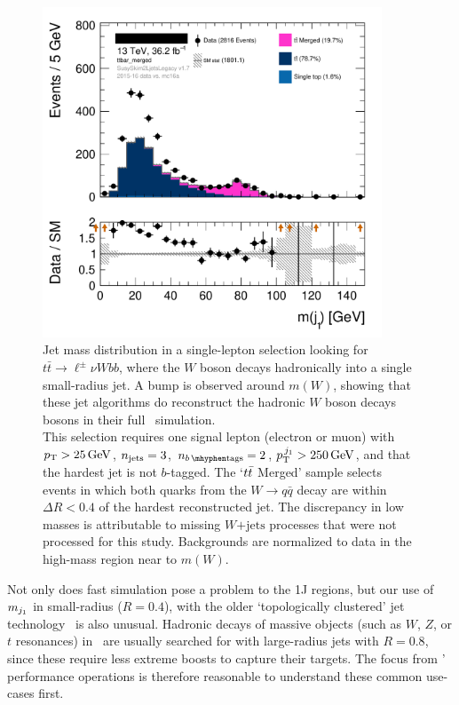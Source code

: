 \begin{figure}[tp]
\centering
\includegraphics[width=0.9\textwidth]{figures/2Ljets_hist1d_jetM0_ttbar_merged_tweak.png}
\caption[
Jet mass distribution in a single-lepton selection looking for
$t\bar t \rightarrow \ell^\pm\nu W(J) \bar bb$
]{%
Jet mass distribution in a single-lepton selection looking for
$t\bar t \rightarrow \ell^\pm\nu W bb$, where the $W$ boson decays hadronically
into a single small-radius jet.
A bump is observed around $m(W)$, showing that these jet algorithms do
reconstruct the hadronic $W$ boson decays bosons in their full \atlas\
simulation.
\\
This selection requires one signal lepton (electron or muon) with
$\pt > 25\,\eV[G]$, $\njet = 3$, $\nbtag = 2$, $\ptjone > 250\,\eV[G]$,
and that the hardest jet is not $b$-tagged.
The `$\ttbar$ Merged' sample selects events in which both quarks from the
$W\rightarrow q\bar q$ decay are within $\Delta R < 0.4$ of the hardest
reconstructed jet.
The discrepancy in low masses is attributable to missing $W\mathrm{+jets}$
processes that were not processed for this study.
Backgrounds are normalized to data in the high-mass region near to $m(W)$.
}
\label{fig:2ljets_jetm_ttbar_mw}
\end{figure}

Not only does fast simulation pose a problem to the 1J regions, but our use
of $\mjetone$ in small-radius ($R=0.4$), with the older
`topologically clustered' jet technology~\cite{atlas_jet_topo_PERF_2014_07}
is also unusual.
Hadronic decays of massive objects
(such as $W$, $Z$, or $t$ resonances) in \atlas\ are usually searched for with
large-radius jets with $R=0.8$, since these require less extreme boosts to
capture their targets.
The focus from \atlas' performance operations is therefore reasonable to
understand these common use-cases first.

